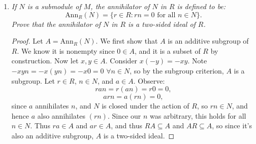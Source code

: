 \documentclass[10pt,oneside,reqno]{amsart}
\theoremstyle{plain}
\newcommand{\sub}{\subseteq}
\newcommand{\z}{\mathbb{Z}}
\theoremstyle{definition}
\theoremstyle{remark}
\begin{document}
\begin{enumerate}[label=\arabic*.]
\begin{enumerate}
\vspace{3mm}
\item \textit{Give an example of a ring $R$ and an $R$-module $M$ such that $Tor(M)$ is not a submodule (consider the torsion elements in the $R$-module $R$). }

So from the previous exercise, we know we must choose some $R$ which is not an integral domain. We consider the torsion elements in the $R$-module $R$, which are:
$$
\text{Tor}(R) = \{r \in R: sr = 0 \text{ for some nonzero }s \in R\},
$$
but these are exactly the right zero divisors of $R$. We consider the ring $R = \mathbb{Z}_6 \cong \z/6\z$, and the module of $R$ over itself. Note that in $R$, $2 \cdot 3 = 6 = 0$, $4\cdot 3 = 12 = 0$, and $1,5$ are not zero divisors, so we have:
$$
\text{Tor}(R) = \{0,2,3,4\}.
$$
So note that $2,3\in \text{Tor}(R)$ and $1 \in R$, but $2 + 1\cdot 3 = 5 \notin \text{Tor}(R)$, so by the submodule criterion, it is not a submodule. 

\vspace{3mm}
\item \textit{If $R$ has zero divisors, show that every nonzero $R$-module has nonzero torsion elements. }

\begin{proof}
Suppose $R$ has zero divisors. So $\exists r,s \in R$ nonzero such that $rs = 0$. Now let $M$ be an $R$-module. We wish to show that $\exists m \in M$ s.t. $m \neq 0$, $tm = 0$ for some nonzero $t \in R$. Let $n \in M$ s.t. $n \neq 0$. Now consider $sn \in M$ and $r \in R$. Now note that $rsn = 0$ and that $r$ and $sn$ are both nonzero, so $sn$ is a nonzero torsion element. 
\end{proof}
\end{enumerate}
\vspace{3mm}
\item \textit{If $N$ is a submodule of $M$, the annihilator of $N$ in $R$ is defined to be: 
$$
\text{Ann}_R(N) = \{r \in R:rn = 0 \text{ for all }n \in N\}.
$$
Prove that the annihilator of $N$ in $R$ is a two-sided ideal of $R$. 
}

\begin{proof}
Let $A = \text{Ann}_R(N)$. We first show that $A$ is an additive subgroup of $R$. We know it is nonempty since $0 \in A$, and it is a subset of $R$ by construction. Now let $x,y \in A$. Consider $x(-y) = -xy$. Note $-xyn = -x(yn) = -x0 = 0$ $\forall n \in N$, so by the subgroup criterion, $A$ is a subgroup. Let $r \in R$, $n \in N$, and $a \in A$. Observe:
$$
ran = r(an) = r0 = 0,
$$
$$
arn = a(rn) = 0,
$$
since $a$ annihilates $n$, and $N$ is closed under the action of $R$, so $rn \in N$, and hence $a$ also annihilates $(rn)$. Since our $n$ was arbitrary, this holds for all $n \in N$. Thus $ra \in A$ and $ar \in A$, and thus $RA \sub A$ and $AR \sub A$, so since it's also an additive subgroup, $A$ is a two-sided ideal. 
\end{proof}


\end{enumerate}
\end{document}

